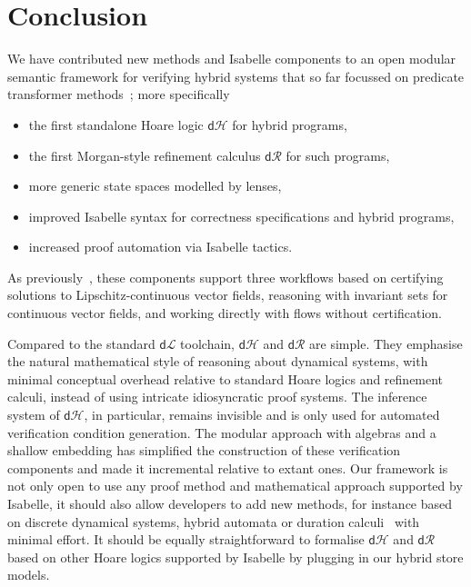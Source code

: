\documentclass[envcountsame]{llncs}
\newcommand{\dL}{\mathsf{d}\mathcal{L}}
\newcommand{\dH}{\mathsf{d}\mathcal{H}}
\newcommand{\dR}{\mathsf{d}\mathcal{R}}
\begin{document}

\section{Conclusion}\label{sec:conclusion}

We have contributed new methods and Isabelle components to an open
modular semantic framework for verifying hybrid systems that so far
focussed on predicate transformer methods~\cite{MuniveS19}; more
specifically
\begin{itemize}
\item the first standalone Hoare logic $\dH$ for hybrid programs, 
\item the first Morgan-style refinement calculus $\dR$ for such programs,
\item more generic state spaces modelled by lenses,
\item improved Isabelle syntax for correctness specifications
  and hybrid programs,
\item increased proof automation via Isabelle tactics. 
\end{itemize}
As previously~\cite{MuniveS19}, these components support three
workflows based on certifying solutions to Lipschitz-continuous vector
fields, reasoning with invariant sets for continuous vector fields,
and working directly with flows without certification. 

Compared to the standard $\dL$ toolchain, $\dH$ and $\dR$ are
simple. They emphasise the natural mathematical style of reasoning
about dynamical systems, with minimal conceptual overhead relative to
standard Hoare logics and refinement calculi, instead of using
intricate idiosyncratic proof systems. The inference system of $\dH$,
in particular, remains invisible and is only used for automated
verification condition generation. The modular approach with algebras
and a shallow embedding has simplified the construction of these
verification components and made it incremental relative to extant
ones. Our framework is not only open to use any proof method and
mathematical approach supported by Isabelle, it should also allow
developers to add new methods, for instance based on discrete
dynamical systems, hybrid automata or duration calculi~\cite{***} with
minimal effort. It should be equally straightforward to formalise
$\dH$ and $\dR$ based on other Hoare logics supported by Isabelle by
plugging in our hybrid store models.
\end{document}

